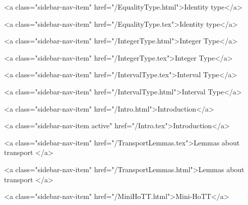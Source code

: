       
        
          <a class="sidebar-nav-item" href="/EqualityType.html">Identity type</a>
        
      
    
      
        
          <a class="sidebar-nav-item" href="/EqualityType.tex">Identity type</a>
        
      
    
      
        
          <a class="sidebar-nav-item" href="/IntegerType.html">Integer Type</a>
        
      
    
      
        
          <a class="sidebar-nav-item" href="/IntegerType.tex">Integer Type</a>
        
      
    
      
        
          <a class="sidebar-nav-item" href="/IntervalType.tex">Interval Type</a>
        
      
    
      
        
          <a class="sidebar-nav-item" href="/IntervalType.html">Interval Type</a>
        
      
    
      
        
          <a class="sidebar-nav-item" href="/Intro.html">Introduction</a>
        
      
    
      
        
          <a class="sidebar-nav-item active" href="/Intro.tex">Introduction</a>
        
      
    
      
        
          <a class="sidebar-nav-item" href="/TransportLemmas.tex">Lemmas about transport </a>
        
      
    
      
        
          <a class="sidebar-nav-item" href="/TransportLemmas.html">Lemmas about transport </a>
        
      
    
      
        
          <a class="sidebar-nav-item" href="/MiniHoTT.html">Mini-HoTT</a>
        
      
    
